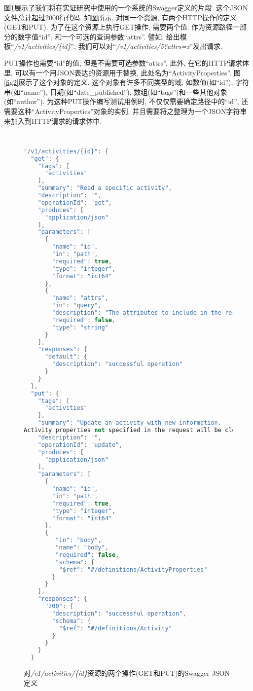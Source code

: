     图\ref{fig1}展示了我们将在实证研究中使用的一个系统的Swagger定义的片段. 这个JSON文件总计超过2000行代码. 如图所示, 对同一个资源, 有两个HTTP操作的定义(GET和PUT). 为了在这个资源上执行GET操作, 需要两个值: 作为资源路径一部分的数字值“id”, 和一个可选的查询参数“attrs”. 譬如, 给出模板“\textit{/v1/activities/\{id\}}”, 我们可以对“\textit{/v1/activities/5?attrs=x}”发出请求. 
    
    PUT操作也需要“id”的值, 但是不需要可选参数“attrs”. 此外, 在它的HTTP请求体里, 可以有一个用JSON表达的资源用于替换, 此处名为“ActivityProperties”. 图\ref{fig2}展示了这个对象的定义. 这个对象有许多不同类型的域, 如数值(如“id”), 字符串(如“name”), 日期(如“date\_published”), 数组(如“tags”)和一些其他对象(如“author”). 为这种PUT操作编写测试用例时, 不仅仅需要确定路径中的“id”, 还需要这种“ActivityProperties”对象的实例, 并且需要将之整理为一个JSON字符串来加入到HTTP请求的请求体中. 
    
    \begin{figure}
      {
      \tt
        \scriptsize
      \begin{lstlisting}[language=C++]
"/v1/activities/{id}": { 
  "get": {
    "tags": [ 
      "activities"
    ],
    "summary": "Read a specific activity", 
    "description": "",
    "operationId": "get",
    "produces": [
      "application/json" 
    ],
    "parameters": [ 
      {
        "name": "id", 
        "in": "path", 
        "required": true, 
        "type": "integer", 
        "format": "int64"
      }, 
      {
        "name": "attrs",
        "in": "query",
        "description": "The attributes to include in the response. Comma-separated list.", 
        "required": false,
        "type": "string" 
      }
    ], 
    "responses": {
      "default": {
        "description": "successful operation"
      } 
    }
  }, 
  "put": {
    "tags": [ 
      "activities"
    ],
    "summary": "Update an activity with new information.
Activity properties not specified in the request will be cleared.", 
    "description": "", 
    "operationId": "update", 
    "produces": [
      "application/json" 
    ],
    "parameters": [ 
      {
        "name": "id", 
        "in": "path", 
        "required": true, 
        "type": "integer", 
        "format": "int64"
      }, 
      {
         "in": "body", 
         "name": "body", 
         "required": false, 
         "schema": {
          "$ref": "#/definitions/ActivityProperties"
        }
      }
    ],
    "responses": {
      "200": {
        "description": "successful operation",
        "schema": {
          "$ref": "#/definitions/Activity"
        }
      }
    }
  }
        \end{lstlisting}
        }
      \caption{对\textit{/v1/activities/\{id\}}资源的两个操作(GET和PUT)的Swagger JSON定义}
        \label{fig1}
    \end{figure}
    
